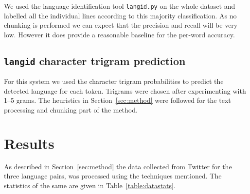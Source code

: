 \documentclass[11pt]{article}
\begin{document}
We used the language identification tool \texttt{langid.py} \cite{lui2012langid} on the whole dataset and labelled all the individual lines according to this majority classification. As no chunking is performed we can expect that the precision and recall will be very low. However it does provide a reasonable baseline for the per-word accuracy.  

\subsection{\texttt{langid} character trigram prediction}
\vspace{-0.132cm}
\label{langidstuff}


For this system we used the character trigram probabilities to predict the detected language for each token. Trigrams were chosen after experimenting with 1--5 grams. The heuristics in Section~\ref{sec:method} were followed for the text processing and chunking part of the method.

\section{Results}
\label{sec:results}
As described in Section~\ref{sec:method} the data collected from Twitter for the three language pairs, was processed using the techniques mentioned. The statistics of the same are given in Table~\ref{table:datastats}. 
\end{document}
